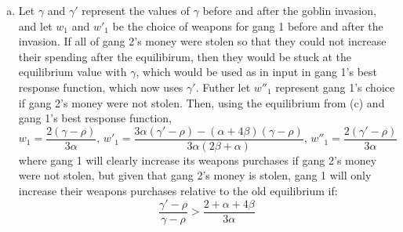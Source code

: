 \documentclass{article}
\begin{document}
\begin{enumerate}[(a)]
	\item Let $\gamma$ and $\gamma'$ represent the values of $\gamma$ before and after the goblin invasion, and let $w_1$ and $w'_1$ be the choice of weapons for gang 1 before and after the invasion. If all of gang 2's money were stolen so that they could not increase their spending after the equilibirum, then they would be stuck at the equilibrium value with $\gamma$, which would be used as in input in gang 1's best response function, which now uses $\gamma'$. Futher let $w''_1$ represent gang 1's choice if gang 2's money were not stolen. Then, using the equilibrium from (c) and gang 1's best response function,
		\[
			w_1 = \frac{2(\gamma-\rho)}{3\alpha}\text{,    }w'_1 = \frac{3\alpha(\gamma'-\rho)-(\alpha+4\beta)(\gamma-\rho)}{3\alpha(2\beta + \alpha)}\text{,    }w''_1 = \frac{2(\gamma'-\rho)}{3\alpha}
		\]
		where gang 1 will clearly increase its weapons purchases if gang 2's money were not stolen, but given that gang 2's money is stolen, gang 1 will only increase their weapons purchases relative to the old equilibrium if:
		\[
			\frac{\gamma'-\rho}{\gamma-\rho} > \frac{2+\alpha+4\beta}{3\alpha}
		\]
	
\end{enumerate}



\pagebreak
\end{document}
